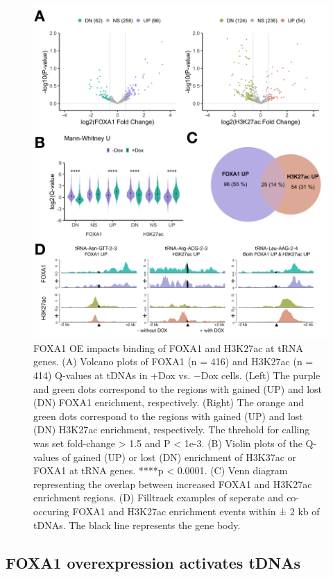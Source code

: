 \documentclass[
  12pt,
]{article}
\begin{document}
\begin{figure}[p]
\includegraphics[width=1\linewidth]{../images/results-02} \caption{FOXA1 OE impacts binding of FOXA1 and H3K27ac at tRNA genes. (A) Volcano plots of FOXA1 (n = 416) and H3K27ac (n = 414) Q-values at tDNAs in +Dox vs. −Dox cells. (Left) The purple and green dots correspond to the regions with gained (UP) and lost (DN) FOXA1 enrichment, respectively. (Right) The orange and green dots correspond to the regions with gained (UP) and lost (DN) H3K27ac enrichment, respectively. The threhold for calling was set fold-change > 1.5 and P < 1e-3. (B) Violin plots of the Q-values of gained (UP) or lost (DN) enrichment of H3K37ac or FOXA1 at tRNA genes. ****p < 0.0001. (C) Venn diagram representing the overlap between increased FOXA1 and H3K27ac enrichment regions. (D) Filltrack examples of seperate and co-occuring FOXA1 and H3K27ac enrichment events within ± 2 kb of tDNAs. The black line represents the gene body.}\label{fig:results-2}
\end{figure}

\hypertarget{foxa1-overexpression-activates-tdnas}{%
\subsection{FOXA1 overexpression activates tDNAs}\label{foxa1-overexpression-activates-tdnas}}
\end{document}
